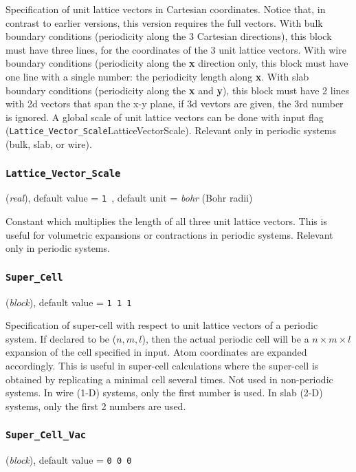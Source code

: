 \documentclass{article}
\begin{document}
Specification of unit lattice vectors in Cartesian coordinates. Notice
that, in contrast to earlier versions, this version requires the full
vectors. With bulk boundary conditions (periodicity along the 3
Cartesian directions), this block must have three lines, for the
coordinates of the 3 unit lattice vectors. With wire boundary
conditions (periodicity along the {\bf x} direction only, this block
must have one line with a single number: the periodicity length along
{\bf x}. With slab boundary conditions (periodicity along the {\bf x} and 
{\bf y}), this block must have 2 lines with 2d vectors that span the x-y
plane, if 3d vevtors are given, the 3rd number is ignored.  A global scale of unit lattice vectors can be done with input
flag ({\tt Lattice\_Vector\_Scale}{LatticeVectorScale}).
Relevant only in periodic systems (bulk, slab, or wire). 

\subsubsection{\tt Lattice\_Vector\_Scale 
\label{LatticeVectorScale}}
({\it real}),
default value = {\tt 1 },
default unit = {\it bohr} (Bohr radii)

Constant which multiplies the length of all three unit lattice
vectors. This is useful for volumetric expansions or contractions in
periodic systems. Relevant only in periodic systems.

\subsubsection{\tt Super\_Cell 
\label{SuperCell}}
({\it block}),
default value = {\tt 1 1 1 }

Specification of super-cell with respect to unit lattice vectors of a
periodic system. If declared to be ($n,m,l$), then the actual periodic
cell will be a $n \times m \times l$ expansion of the cell specified in
input. Atom coordinates are expanded accordingly. This is useful in
super-cell calculations where the super-cell is obtained by
replicating a minimal cell several times. Not used in non-periodic
systems. In wire (1-D) systems, only the first number is used. In slab 
(2-D) systems, only the first 2 numbers are used.

\subsubsection{\tt Super\_Cell\_Vac 
\label{SuperCellVac}}
({\it block}),
default value = {\tt 0 0 0 }
\end{document}

